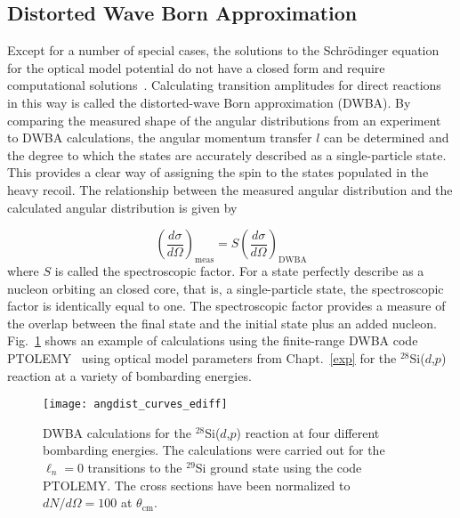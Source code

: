 \subsection{Distorted Wave Born Approximation}
\label{dwba}
Except for a number of special cases, the solutions to the Schr\"odinger equation for the optical model potential do not have a closed form and require computational solutions~\cite{Glendenning_2004}.  Calculating transition amplitudes for direct reactions in this way is called the distorted-wave Born approximation (DWBA).  By comparing the measured shape of the angular distributions from an experiment to DWBA calculations, the angular momentum transfer $l$ can be determined and the degree to which the states are accurately described as a single-particle state.  This provides a clear way of assigning the spin to the states populated in the heavy recoil.  The relationship between the measured angular distribution  and the calculated angular distribution is given by

\begin{equation}
\left(\frac{d\sigma}{d\Omega}\right)_\textrm{meas}=S\left(\frac{d\sigma}{d\Omega}\right)_\textrm{DWBA}
\label{eq:}
\end{equation}
where $S$ is called the spectroscopic factor.  For a state perfectly describe as a nucleon orbiting an closed core, that is, a single-particle state, the spectroscopic factor is identically equal to one.  The spectroscopic factor provides a measure of the overlap between the final state and the initial state plus an added nucleon.  Fig.~\ref{dwba_ediff} shows an example of calculations using the finite-range DWBA code PTOLEMY~\cite{Macfarlane_1978} using optical model parameters from Chapt.~\ref{exp} for the $^{28}$Si($d$,$p$) reaction at a variety of bombarding energies.

\begin{figure}%
\centering
\texttt{[image: angdist\_curves\_ediff]}%
\caption[DWBA calculations for the $^{28}$Si($d$,$p$) reaction at four different bombarding energies]{DWBA calculations for the $^{28}$Si($d$,$p$) reaction at four different bombarding energies.  The calculations were carried out for the $\ell_n=0$ transitions to the $^{29}$Si ground state using the code PTOLEMY.  The cross sections have been normalized to $dN/d\Omega=100$ at $\theta_\mathrm{cm}$.}%
\label{dwba_ediff}%
\end{figure}


